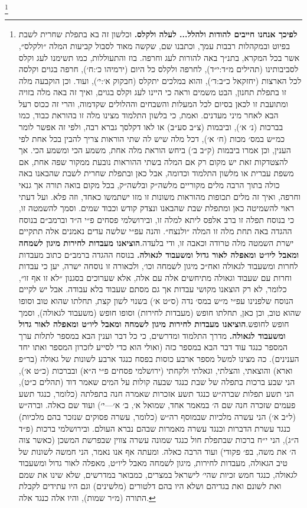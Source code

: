 \documentclass[12pt, openany]{book}
\newcommand{\footnotecomment}[1]{
	\renewcommand\thefootnote{}
	\footnote{\textsf{#1}}}
\newcommand{\commenta}[1]{\footnotecomment{#1}\hspace{0em}}
\begin{document}
\commenta{\textrm{\textbf{לפיכך אנחנו חייבים להודות ולהלל... לעלה ולקלס.}} וכלשון זה בא בתפלת שחרית לשבת בפיוט ובמקהלות רבבות עמך, וכתבנו שם, שקשה מאוד לסבול קביעות המלה ״ולקלס״, אשר בכל המקרא, בתנ״ך באה להורות לעג וחרפה. בוז והתעוללות, כמו תשימנו לעג וקלס לסביבותינו (תהילים מ״ד:י״ד), לחרפה ולקלס כל היום (ירמיהו כ׳:ח׳), חרפה בגוים וקלסה לכל הארצות (יחזקאל כ״ב:ד׳), והוא במלכים יתקלס (חבקוק א׳:י׳), ועוד. וכן הוקבעה מלה זו בתפלת תחנון, הבט משמים וראה כי היינו לעג וקלס בגוים, ואיך זה באה מלה בזויה ומתועבת זו לכאן בסיום לכל המעלות והשבחים וההלולים שקדמוה, והרי זה ככוס רעל הבא לאחר מיני מעדנים. ואמת, כי בלשון התלמוד מצינו מלה זו בהוראת כבוד, כמו בברכות (נ׳ א׳), וביבמות (צ״ב סע״ב) או לאו דקלסך גברא רבה, ולפי זה אפשר לומר כמ״ש במס׳  מכות (ח׳ א׳), דכל מלה שיש לה שתי הוראות צריך להבין בכל אחת לפי הענין, וכן אמרו ביבמות (ק״ב ב׳) ביחש הוראת מלה אחת, משמע הכי ומשמע הכי. אך להצטדקות זאת יש מקום רק אם המלה בשתי ההוראות נובעת ממקור שפה אחת, אם משפת עברית או מלשון התלמוד וכדומה, אבל כאן ובתפלת שחרית לשבת שהבאנו באה כולה בתוך הרבה מלים מקוריים מלשה״ק ובלשה״ק, בכל מקום בואה תורה אך גנאי וחרפה, ואיך זה מלים תכופות מהוראות משונות זו מזו ישתמשו כאחד, וזה פלא. ועל דעתי ראוי להשמיטה כאן ומתפלת שבת שהבאנו ונצדק קודש וכבוד שמים. וסמך להשמטה זו, כי בנוסח תפלה זו ברב אלפס ליתא למלה זו, ובירושלמי פסחים פ״י ה״ד וברמב״ם בנוסח ההגדה באה תחת מלה זו המלה ״ולנצח״. והנה עפ״י שלשה עדים נאמנים אלה תתקיים ישרת השמטה מלה טרודה וכאבה זו, ודי בלעדה.\textrm{\textbf{הוציאנו מעבדות לחירות מיגון לשמחה ומאבל ליו״ט ומאפלה לאור גדול ומשעבוד לגאולה.}} בנוסח ההגדה ברמב״ם כתוב מעבדות לחרות ומשעבוד לגאולה ואח״כ מיגון לשמחה וכו׳, ולכאורה זו נוסחה ישרה, יען כי עבדות וחרות עם שעבוד וגאולה מתיחשים אלה עם אלה, אלא שערוכים בסגנון ״לא זו אף זו״, כלומר, לא רק הוצאנו מקושי עבדות אך גם מסתם שעבוד בלא עבודה. אבל יש לקיים הנוסח שלפנינו עפ״י מ״ש במס׳ נדה (ס״ט א׳) בשנוי לשון קצת, תחלתו שהוא טוב וסופו שהוא טוב, וכן כאן, תחלתו חופש (מעבדות לחירות) וסופו חופש (משעבוד לגאולה), וסמך חופש לחופש.\textrm{\textbf{הוציאנו מעבדות לחירות מיגון לשמחה ומאבל ליו״ט ומאפלה לאור גדול ומשעבוד לגאולה.}} מדרך התלמוד ומדרשים, כי כל דבר וענין הבא במספר לתלות ערך המספר כנגד עוד דבר הבא במספר כזה (ואולי הוא כדי לסייע לזכרון המספר ואתו יחד הענינים). כה מצינו למשל מספר ארבע כוסות בפסח כנגד ארבע לשונות של גאולה (בר״פ וארא) והוצאתי, והצלתי, וגאלתי ולקחתי (ירושלמי פסחים פ״י ה״א) ובברכות (כ״ט א׳), הני שבע ברכות בתפלה של שבת כנגד שבעה קולות על המים שאמר דוד (תהלים כ״ט), הני תשע תפלות שברה״ש כנגד תשע אזכרות שאמרה חנה בתפלתה (כלומר, כנגד תשע פעמים שזכרה חנה שם ה׳ במאמר אחד, שמואל א׳, ב׳ א׳—י׳) ועוד שם כאלה. וברה״ש (ל״ב א׳) הני עשרה מלכיות שבמוסף רה״ש (כלומר, עשרה פסוקים שנזכר בהם מלכיות) כנגד עשרת הדברות וכנגד עשרה מאמרות שבהם נברא העולם. ובירושלמי ברכות (פ״ד ה״ג), הני י״ח ברכות שבתפלת חול כנגד שמונה עשרה צווין שבפרשת המשכן (כאשר צוה ה׳ את משה, בפ׳ פקודי) ועוד הרבה כאלה. ומעתה אף אנו נאמר, הני חמשה לשונות של טיב הגאולה, מעבדות לחירות, מיגון לשמחה מאבל ליו״ט, מאפלה לאור גדול ומשעבוד לגאולה, כנגד חמש זכיות שהי׳ לישראל במצרים, כמבואר במדרשים, שלא שינו את שמם ואת לשונם ואת בגדיהם ושלא היו בהם דלטורים (מלשינים) וגם היו עתידים לקבלת התורה (מ״ר שמות), והיו אלה כנגד אלה.}%
\end{document}
